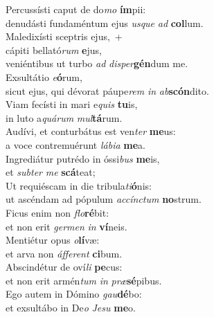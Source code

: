\evenverse Percussísti caput de do\textit{mo} \textbf{ím}pii:~\*\\
\evenverse denudásti fundaméntum ejus \textit{us}\textit{que} \textit{ad} \textbf{col}lum.\\
\oddverse Maledixísti sceptris ejus,~+\\
\oddverse  cápiti bellató\textit{rum} \textbf{e}jus,~\*\\
\oddverse veniéntibus ut turbo \textit{ad} \textit{di}\textit{sper}\textbf{gén}dum me.\\
\evenverse Exsultátio \textit{e}\textbf{ó}rum,~\*\\
\evenverse sicut ejus, qui dévorat páupe\textit{rem} \textit{in} \textit{ab}\textbf{scón}dito.\\
\oddverse Viam fecísti in mari e\textit{quis} \textbf{tu}is,~\*\\
\oddverse in luto a\textit{quá}\textit{rum} \textit{mul}\textbf{tá}rum.\\
\evenverse Audívi, et conturbátus est ven\textit{ter} \textbf{me}us:~\*\\
\evenverse a voce contremuérunt \textit{lá}\textit{bi}\textit{a} \textbf{me}a.\\
\oddverse Ingrediátur putrédo in óssi\textit{bus} \textbf{me}is,~\*\\
\oddverse et \textit{sub}\textit{ter} \textit{me} \textbf{scá}teat;\\
\evenverse Ut requiéscam in die tribula\textit{ti}\textbf{ó}nis:~\*\\
\evenverse ut ascéndam ad pópulum \textit{ac}\textit{cín}\textit{ctum} \textbf{no}strum.\\
\oddverse Ficus enim non \textit{flo}\textbf{ré}bit:~\*\\
\oddverse et non erit \textit{ger}\textit{men} \textit{in} \textbf{ví}neis.\\
\evenverse Mentiétur opus \textit{o}\textbf{lí}væ:~\*\\
\evenverse et arva non \textit{áf}\textit{fe}\textit{rent} \textbf{ci}bum.\\
\oddverse Abscindétur de oví\textit{li} \textbf{pe}cus:~\*\\
\oddverse et non erit armén\textit{tum} \textit{in} \textit{præ}\textbf{sé}pibus.\\
\evenverse Ego autem in Dómino \textit{gau}\textbf{dé}bo:~\*\\
\evenverse et exsultábo in De\textit{o} \textit{Je}\textit{su} \textbf{me}o.\\
